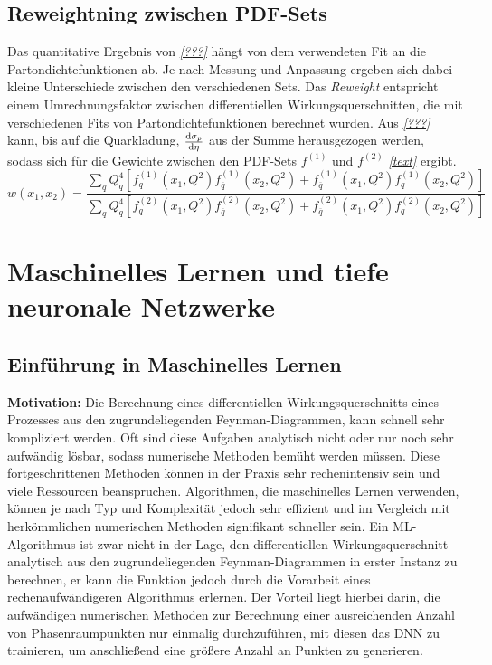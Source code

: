 \section{Reweightning zwischen PDF-Sets}
Das quantitative Ergebnis von \textit{\autoref{???}} hängt von dem verwendeten Fit an die Partondichtefunktionen ab. Je nach Messung und Anpassung ergeben sich dabei kleine Unterschiede zwischen den verschiedenen Sets. Das \textit{Reweight} entspricht einem Umrechnungsfaktor zwischen differentiellen Wirkungsquerschnitten, die mit verschiedenen Fits von Partondichtefunktionen berechnet wurden. Aus \textit{\autoref{???}} kann, bis auf die Quarkladung,  $\derivative{\sigma_p}{\eta}$ aus der Summe herausgezogen werden, sodass sich für die Gewichte zwischen den PDF-Sets $f^{(1)}$ und $f^{(2)}$ \textit{\autoref{text}} ergibt.
\begin{equation}
w\left(x_1, x_2\right) = \frac{ \sum_{q} Q_q^4 \left[f_q^{(1)}(x_1, Q^2)f_{\overline{q}}^{(1)}(x_2, Q^2) +f_{\overline{q}}^{(1)}(x_1, Q^2)f_{q}^{(1)}(x_2, Q^2) \right]}{\sum_{q} Q_q^4 \left[f_q^{(2)}(x_1, Q^2)f_{\overline{q}}^{(2)}(x_2, Q^2) +f_{\overline{q}}^{(2)}(x_1, Q^2)f_{q}^{(2)}(x_2, Q^2) \right]}
\end{equation}
\chapter{Maschinelles Lernen und tiefe neuronale Netzwerke}
\section{Einführung in Maschinelles Lernen}
\textbf{Motivation:}
Die Berechnung eines differentiellen Wirkungsquerschnitts eines Prozesses aus den zugrundeliegenden Feynman-Diagrammen, kann schnell sehr kompliziert werden. Oft sind diese Aufgaben analytisch nicht oder nur noch sehr aufwändig lösbar, sodass numerische Methoden bemüht werden müssen. Diese fortgeschrittenen Methoden können in der Praxis sehr rechenintensiv sein und viele Ressourcen beanspruchen. Algorithmen, die maschinelles Lernen verwenden, können je nach Typ und Komplexität jedoch sehr effizient und im Vergleich mit herkömmlichen numerischen Methoden signifikant schneller sein. Ein ML-Algorithmus ist zwar nicht in der Lage, den differentiellen Wirkungsquerschnitt analytisch aus den zugrundeliegenden Feynman-Diagrammen in erster Instanz zu berechnen, er kann die Funktion jedoch durch die Vorarbeit eines rechenaufwändigeren Algorithmus erlernen. Der Vorteil liegt hierbei darin, die aufwändigen numerischen Methoden zur Berechnung einer ausreichenden Anzahl von Phasenraumpunkten nur einmalig durchzuführen, mit diesen das DNN zu trainieren, um anschließend eine größere Anzahl an Punkten zu generieren.

